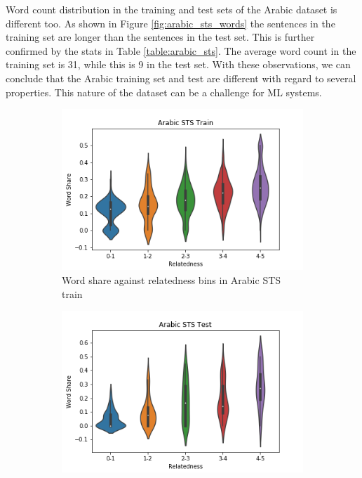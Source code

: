 \begin{enumerate}
Word count distribution in the training and test sets of the Arabic dataset is different too. As shown in Figure \ref{fig:arabic_sts_words} the sentences in the training set are longer than the sentences in the test set. This is further confirmed by the stats in Table \ref{table:arabic_sts}. The average word count in the training set is 31, while this is 9 in the test set. With these observations, we can conclude that the Arabic training set and test are different with regard to several properties. This nature of the dataset can be a challenge for ML systems.

\begin{figure}
	\captionsetup[subfigure]{justification=centering}
	\centering
	\begin{subfigure}[b]{.5\textwidth}
		\centering
		\includegraphics[width=\textwidth]{figures/semantic_textual_similarity/introduction/arabic_sts_train_word_share.png}
		\caption{Word share against relatedness bins in Arabic STS train}
		\label{fig:arabic_sts_train_word_share}
	\end{subfigure}%
	\begin{subfigure}[b]{.5\textwidth}
		\centering
		\includegraphics[width=\textwidth]{figures/semantic_textual_similarity/introduction/arabic_sts_test_word_share.png}

\end{subfigure}
\end{figure}
\end{enumerate}
